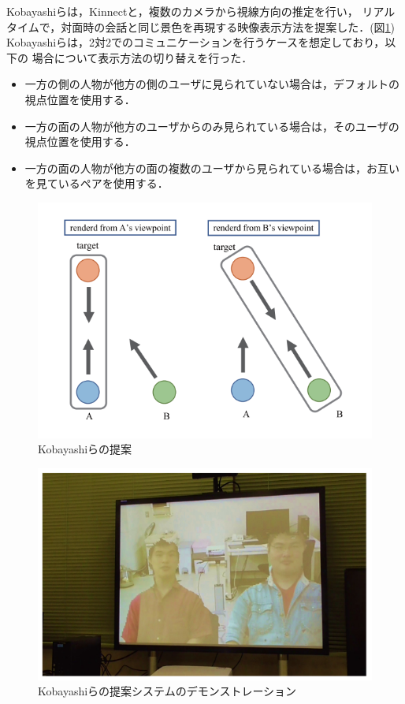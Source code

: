 Kobayashiら\cite{29}は，Kinnectと，複数のカメラから視線方向の推定を行い，
リアルタイムで，対面時の会話と同じ景色を再現する映像表示方法を提案した．(図\ref{Kobayashi})
Kobayashiらは，2対2でのコミュニケーションを行うケースを想定しており，以下の
場合について表示方法の切り替えを行った．
\begin{itemize}
  \item 一方の側の人物が他方の側のユーザに見られていない場合は，デフォルトの視点位置を使用する．
  \item  一方の面の人物が他方のユーザからのみ見られている場合は，そのユーザの視点位置を使用する．
  \item  一方の面の人物が他方の面の複数のユーザから見られている場合は，お互いを見ているペアを使用する．
\end{itemize}

\begin{figure}[tbp]
  \centering
  \includegraphics[scale=0.8]{fig/gaze.png}
  \caption{Kobayashiらの提案\cite{29}}\label{Kobayashi}
\end{figure}

\begin{figure}[tbp]
  \centering
  \includegraphics[scale=0.8]{fig/kobayashi2.png}
  \caption{Kobayashiらの提案システムのデモンストレーション\cite{29}}
\end{figure}



